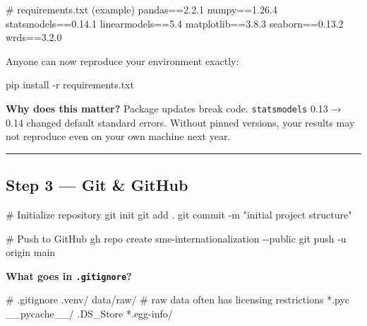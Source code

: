 \documentclass[
  letterpaper,
  DIV=11,
  numbers=noendperiod]{scrartcl}
\newenvironment{Shaded}{\begin{snugshade}}{\end{snugshade}}
\newcommand{\AttributeTok}[1]{\textcolor[rgb]{0.40,0.45,0.13}{#1}}
\newcommand{\CommentTok}[1]{\textcolor[rgb]{0.37,0.37,0.37}{#1}}
\newcommand{\ExtensionTok}[1]{\textcolor[rgb]{0.00,0.23,0.31}{#1}}
\newcommand{\FunctionTok}[1]{\textcolor[rgb]{0.28,0.35,0.67}{#1}}
\newcommand{\NormalTok}[1]{\textcolor[rgb]{0.00,0.23,0.31}{#1}}
\newcommand{\StringTok}[1]{\textcolor[rgb]{0.13,0.47,0.30}{#1}}
\begin{document}
\begin{Shaded}
\begin{Highlighting}[]
\NormalTok{\# requirements.txt (example)}
\NormalTok{pandas==2.2.1}
\NormalTok{numpy==1.26.4}
\NormalTok{statsmodels==0.14.1}
\NormalTok{linearmodels==5.4}
\NormalTok{matplotlib==3.8.3}
\NormalTok{seaborn==0.13.2}
\NormalTok{wrds==3.2.0}
\end{Highlighting}
\end{Shaded}

Anyone can now reproduce your environment exactly:

\begin{Shaded}
\begin{Highlighting}[]
\ExtensionTok{pip}\NormalTok{ install }\AttributeTok{{-}r}\NormalTok{ requirements.txt}
\end{Highlighting}
\end{Shaded}

\textbf{Why does this matter?} Package updates break code.
\texttt{statsmodels} 0.13 → 0.14 changed default standard errors.
Without pinned versions, your results may not reproduce even on your own
machine next year.

\begin{center}\rule{0.5\linewidth}{0.5pt}\end{center}

\subsection{Step 3 --- Git \& GitHub}\label{step-3-git-github}

\begin{Shaded}
\begin{Highlighting}[]
\CommentTok{\# Initialize repository}
\FunctionTok{git}\NormalTok{ init}
\FunctionTok{git}\NormalTok{ add .}
\FunctionTok{git}\NormalTok{ commit }\AttributeTok{{-}m} \StringTok{"initial project structure"}

\CommentTok{\# Push to GitHub}
\ExtensionTok{gh}\NormalTok{ repo create sme{-}internationalization }\AttributeTok{{-}{-}public}
\FunctionTok{git}\NormalTok{ push }\AttributeTok{{-}u}\NormalTok{ origin main}
\end{Highlighting}
\end{Shaded}

\textbf{What goes in \texttt{.gitignore}?}

\begin{Shaded}
\begin{Highlighting}[]
\NormalTok{\# .gitignore}
\NormalTok{.venv/}
\NormalTok{data/raw/          \# raw data often has licensing restrictions}
\NormalTok{*.pyc}
\NormalTok{\_\_pycache\_\_/}
\NormalTok{.DS\_Store}
\NormalTok{*.egg{-}info/}
\end{Highlighting}
\end{Shaded}
\end{document}
